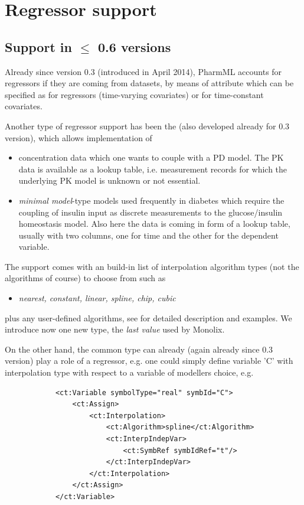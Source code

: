 \section{Regressor support}
\label{sec:regressors}

\subsection{Support in $\leq$ 0.6 versions}
Already since version 0.3 (introduced in April 2014), PharmML accounts for 
regressors if they are coming from datasets, by means of  attribute 
which can be specified as  for regressors (time-varying covariates) 
or  for time-constant covariates. 
 
Another type of regressor support has been the  (also developed 
already for 0.3 version), which allows implementation of
\begin{itemize}
\item 
concentration data which one wants to couple with a PD model. The PK data is 
available as a lookup table, i.e. measurement records for which the underlying 
PK model is unknown or not essential.
\item
\emph{minimal model}-type models used frequently in diabetes which require the coupling
of insulin input as discrete measurements to the glucose/insulin homeostasis model. 
Also here the data is coming in form of a lookup table, usually with two columns, one for 
time and the other for the dependent variable.
\end{itemize}
The support comes with an build-in list of interpolation algorithm types (not the algorithms 
of course) to choose from such as
\begin{itemize}
\item 
\emph{nearest, constant, linear, spline, chip, cubic}
\end{itemize}
plus any user-defined algorithms, see \cite{Swat:2014aa} for detailed description
and examples. We introduce now one new type, the \emph{last value} used by Monolix.


On the other hand, the common  type can already (again already since 
0.3 version) play a role of a regressor, e.g. one could simply define variable 'C'
with interpolation type with respect to a variable of modellers choice, e.g.
\lstset{language=XML}
\begin{lstlisting}
            <ct:Variable symbolType="real" symbId="C">
                <ct:Assign>
                    <ct:Interpolation>
                        <ct:Algorithm>spline</ct:Algorithm>
                        <ct:InterpIndepVar>
                            <ct:SymbRef symbIdRef="t"/>
                        </ct:InterpIndepVar>
                    </ct:Interpolation>
                </ct:Assign>
            </ct:Variable>
\end{lstlisting}

